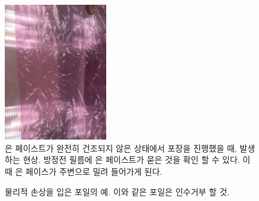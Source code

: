 \documentclass[11pt]{article}
\begin{document}
\begin{figure}[htb]
  \centering
  \includegraphics[width=0.40\textwidth]{Undried_Silver_Paste.jpg}
  \caption[건조되지 않은 은 페이스트]{은 페이스트가 완전히 건조되지 않은 상태에서 포장을 진행했을 때, 발생하는 현상. 방정전 필름에 은 페이스트가 묻은 것을 확인 할 수 있다. 이 때 은 페이스가 주변으로 밀려 들어가게 된다.}
  \label{fig:undried_paste}
\end{figure}
    

\begin{figure}[htb]
  \centering
  \caption[물리적 손상을 입은 포일의 예]{물리적 손상을 입은 포일의 예. 이와 같은 포일은 인수거부 할 것.}
  \label{fig:example_damaged_foils}
\end{figure}
\end{document}
